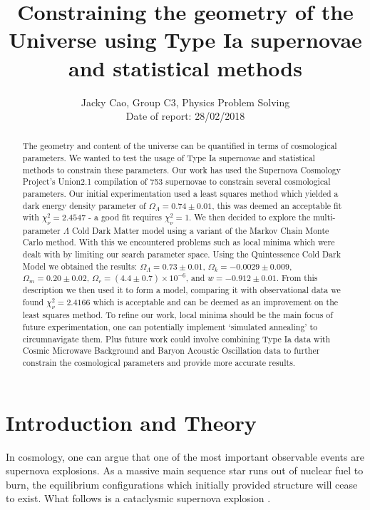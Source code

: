 \documentclass[twocolumn]{revtex4}
\begin{document}
\textheight=26.385cm

\title{Constraining the geometry of the Universe using Type Ia supernovae and statistical methods}
 
\author{Jacky Cao, Group C3, Physics Problem Solving \\ Date of report: 28/02/2018}

\begin{abstract}     
The geometry and content of the universe can be quantified in terms of cosmological parameters. We wanted to test the usage of Type Ia supernovae and statistical methods to constrain these parameters. Our work has used the Supernova Cosmology Project's Union2.1 compilation of 753 supernovae to constrain several cosmological parameters. Our initial experimentation used a least squares method which yielded a dark energy density parameter of $\Omega_\Lambda=0.74\pm0.01$, this was deemed an acceptable fit with $\chi^2_\nu=2.4547$ - a good fit requires $\chi^2_\nu=1$. We then decided to explore the multi-parameter $\Lambda$ Cold Dark Matter model using a variant of the Markov Chain Monte Carlo method. With this we encountered problems such as local minima which were dealt with by limiting our search parameter space. Using the Quintessence Cold Dark Model we obtained the results: $\Omega_\Lambda=0.73\pm0.01$, $\Omega_k=-0.0029\pm0.009$, $\Omega_m = 0.20\pm0.02$, $\Omega_r = (4.4\pm0.7)\times10^{-6}$, and $w=-0.912\pm0.01$. From this description we then used it to form a model, comparing it with observational data we found $\chi^2_\nu=2.4166$ which is acceptable and can be deemed as an improvement on the least squares method. To refine our work, local minima should be the main focus of future experimentation, one can potentially implement `simulated annealing' to circumnavigate them. Plus future work could involve combining Type Ia data with Cosmic Microwave Background and Baryon Acoustic Oscillation data to further constrain the cosmological parameters and provide more accurate results.
\end{abstract}

\maketitle

\vspace{-3ex}
\section{Introduction and Theory} 
\vspace{-2ex}
In cosmology, one can argue that one of the most important observable events are supernova explosions. As a massive main sequence star runs out of nuclear fuel to burn, the equilibrium configurations which initially provided structure will cease to exist. What follows is a cataclysmic supernova explosion \cite{longair}. 
\end{document}
